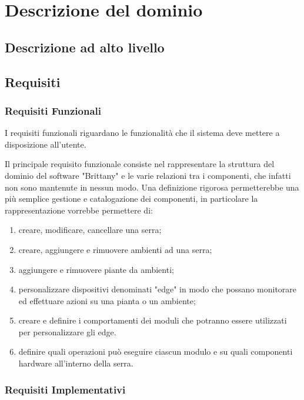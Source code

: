 \section{Descrizione del dominio}

\subsection{Descrizione ad alto livello}

\subsection{Requisiti}

\subsubsection{Requisiti Funzionali}

I requisiti funzionali riguardano le funzionalità che il sistema deve mettere a disposizione all’utente.

\noindent Il principale requisito funzionale consiste nel rappresentare la struttura del dominio del software "Brittany" e le varie relazioni tra i componenti, che infatti non sono mantenute in nessun modo. Una definizione rigorosa permetterebbe una più semplice gestione e catalogazione dei componenti, in particolare la rappresentazione vorrebbe permettere di:
\begin{enumerate}
	\item creare, modificare, cancellare una serra;
	\item creare, aggiungere e rimuovere ambienti ad una serra;
	\item aggiungere e rimuovere piante da ambienti;
	\item personalizzare dispositivi denominati "edge" in modo che possano monitorare ed effettuare azioni su una pianta o un ambiente;
	\item creare e definire i comportamenti dei moduli che potranno essere utilizzati per personalizzare gli edge.
	\item definire quali operazioni può eseguire ciascun modulo e su quali componenti hardware all'interno della serra.
\end{enumerate}

\subsubsection{Requisiti Implementativi}

